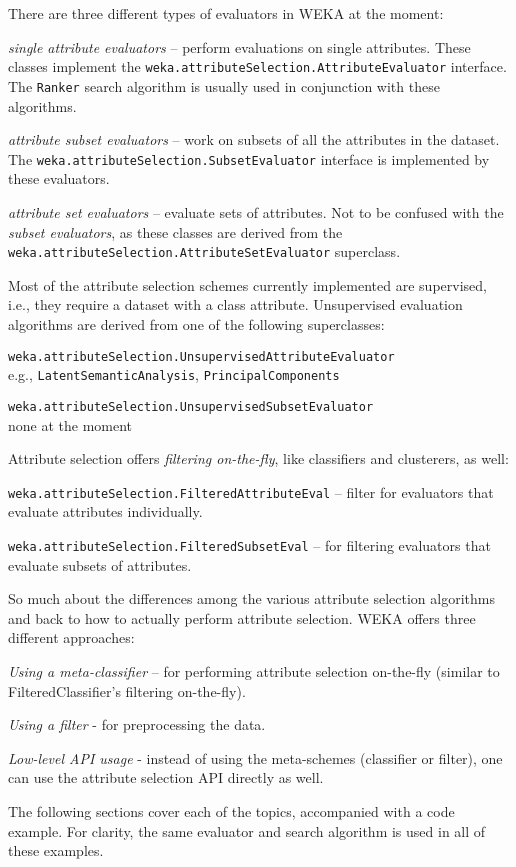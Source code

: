\noindent There are three different types of evaluators in WEKA at the moment:
\begin{tight_itemize}
	\item \textit{single attribute evaluators} -- perform
evaluations on single attributes. These classes implement the
\texttt{weka.attributeSelection.AttributeEvaluator} interface. The
\texttt{Ranker} search algorithm is usually used in conjunction with these
algorithms.
	\item \textit{attribute subset evaluators} -- work on subsets of all the
attributes in the dataset. The \texttt{weka.attributeSelection.SubsetEvaluator}
interface is implemented by these evaluators.
	\item \textit{attribute set evaluators} -- evaluate sets of attributes. Not
to be confused with the \textit{subset evaluators}, as these classes are derived
from the \texttt{weka.attributeSelection.AttributeSetEvaluator} superclass.
\end{tight_itemize}
Most of the attribute selection schemes currently implemented are supervised,
i.e., they require a dataset with a class attribute. Unsupervised evaluation
algorithms
are derived from one of the following superclasses:
\begin{tight_itemize}
	\item \texttt{weka.attributeSelection.UnsupervisedAttributeEvaluator} \\
		e.g., \texttt{LatentSemanticAnalysis}, \texttt{PrincipalComponents}
	\item \texttt{weka.attributeSelection.UnsupervisedSubsetEvaluator} \\
		none at the moment
\end{tight_itemize}
Attribute selection offers \textit{filtering on-the-fly}, like classifiers
and clusterers, as well:
\begin{tight_itemize}
	\item \texttt{weka.attributeSelection.FilteredAttributeEval} -- filter for
evaluators that evaluate attributes individually.
	\item \texttt{weka.attributeSelection.FilteredSubsetEval} -- for
filtering evaluators that evaluate subsets of attributes.
\end{tight_itemize}
So much about the differences among the various attribute selection
algorithms and back to how to actually perform attribute selection. WEKA offers
three different approaches:
\begin{tight_itemize}
	\item \textit{Using a meta-classifier} -- for performing attribute selection
on-the-fly (similar to FilteredClassifier's filtering on-the-fly).
	\item \textit{Using a filter} - for preprocessing the data.
	\item \textit{Low-level API usage} - instead of using the meta-schemes
(classifier or filter), one can use the attribute selection API directly as
well.
\end{tight_itemize}
The following sections cover each of the topics, accompanied with a code
example. For clarity, the same evaluator and search algorithm is used in all
of these examples.

